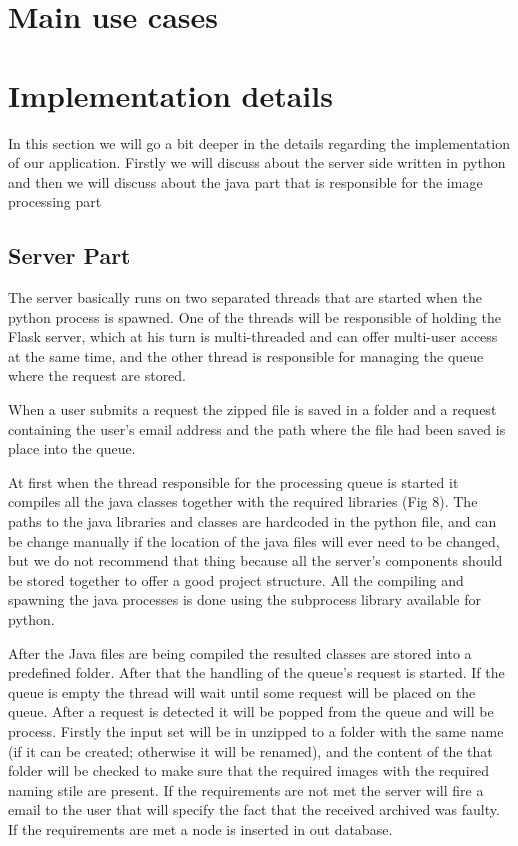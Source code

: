 \documentclass[12pt, a4paper]{report}
\begin{document}
\section{Main use cases}


\section{Implementation details}
\quad
In this section we will go a bit deeper in the details regarding the implementation of our application. Firstly we will discuss about the server side written in python and then we will discuss about the java part that is responsible for the image processing part

\subsection{Server Part}

\quad 
The server basically runs on two separated threads that are started when the python process is spawned. One of the threads will be responsible of holding the Flask server, which at his turn is multi-threaded and can offer multi-user access at the same time, and the other thread is responsible for managing the queue where the request are stored.
\par 

When a user submits a request the zipped file is saved in a folder  and a request containing the user's email address and the path where the file had been saved is place into the queue. 
\par 

At first when the thread responsible for the processing queue is started it compiles all the java classes together with the required libraries (Fig 8). The paths to the java libraries and classes are hardcoded in the python file, and can be change manually if the location of the java files will ever need to be changed, but we do not recommend that thing because all the server's components should be stored together to offer a good project structure. All the compiling and spawning the java processes is done using the subprocess library available for python. 
\par 

After the Java files are being compiled the resulted classes are stored into a predefined folder. After that the handling of the queue's request is started. If the queue is empty the thread will wait until some request will be placed on the queue. After a request is detected it will be popped from the queue and will be process. Firstly the input set will be in unzipped to a folder with the same name (if it can be created; otherwise it will be renamed), and the content of the that folder will be checked to make sure that the required images with the required naming stile are present. If the requirements are not met the server will fire a email to the user that will specify the fact that the received archived was faulty. If the requirements are met a node is inserted in out database.
\par 
\end{document}
